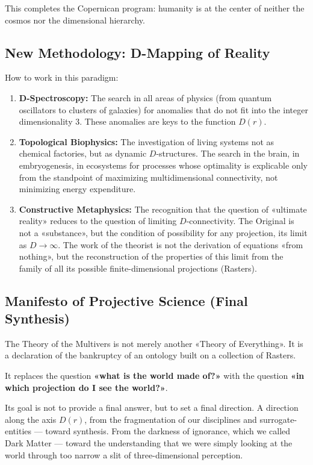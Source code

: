 \documentclass[a4paper,12pt]{article}
\begin{document}
	This completes the Copernican program: humanity is at the center of neither the cosmos nor the dimensional hierarchy.
	
	\subsection{New Methodology: D-Mapping of Reality}
	
	How to work in this paradigm:
	
	\begin{enumerate}
		\item \textbf{D-Spectroscopy:} The search in all areas of physics (from quantum oscillators to clusters of galaxies) for anomalies that do not fit into the integer dimensionality 3. These anomalies are keys to the function $D(r)$.
		\item \textbf{Topological Biophysics:} The investigation of living systems not as chemical factories, but as dynamic $D$-structures. The search in the brain, in embryogenesis, in ecosystems for processes whose optimality is explicable only from the standpoint of maximizing multidimensional connectivity, not minimizing energy expenditure.
		\item \textbf{Constructive Metaphysics:} The recognition that the question of «ultimate reality» reduces to the question of limiting $D$-connectivity. The Original is not a «substance», but the condition of possibility for any projection, its limit as $D \to \infty$. The work of the theorist is not the derivation of equations «from nothing», but the reconstruction of the properties of this limit from the family of all its possible finite-dimensional projections (Rasters).
	\end{enumerate}
	
	\subsection{Manifesto of Projective Science (Final Synthesis)}
	
	The Theory of the Multivers is not merely another «Theory of Everything». It is a declaration of the bankruptcy of an ontology built on a collection of Rasters.
	
	It replaces the question \textbf{«what is the world made of?»} with the question \textbf{«in which projection do I see the world?»}.
	
	Its goal is not to provide a final answer, but to set a final direction. A direction along the axis $D(r)$, from the fragmentation of our disciplines and surrogate-entities — toward synthesis. From the darkness of ignorance, which we called Dark Matter — toward the understanding that we were simply looking at the world through too narrow a slit of three-dimensional perception.
	
\end{document}
